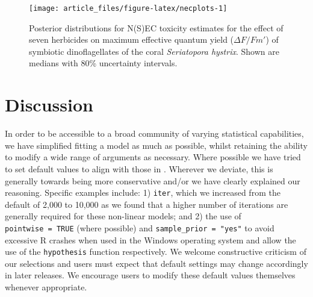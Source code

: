 \documentclass[
  shortnames]{jss}
\begin{document}
\begin{CodeChunk}
\begin{figure}[!ht]

{\centering \texttt{[image: article\_files/figure-latex/necplots-1]} 

}

\caption[Posterior distributions for N(S)EC toxicity estimates for the effect of seven herbicides on maximum effective quantum yield ($\Delta F / Fm'$) of symbiotic dinoflagellates of the coral \textit{Seriatopora hystrix}]{Posterior distributions for N(S)EC toxicity estimates for the effect of seven herbicides on maximum effective quantum yield ($\Delta F / Fm'$) of symbiotic dinoflagellates of the coral \textit{Seriatopora hystrix}. Shown are medians with 80\%  uncertainty intervals.}\label{fig:necplots}
\end{figure}
\end{CodeChunk}

\hypertarget{discussion}{%
\section{Discussion}\label{discussion}}

In order to be accessible to a broad community of varying statistical capabilities, we have simplified fitting a  model as much as possible, whilst retaining the ability to modify a wide range of arguments as necessary. Where possible we have tried to set default values to align with those in . Wherever we deviate, this is generally towards being more conservative and/or we have clearly explained our reasoning. Specific examples include: 1) \texttt{iter}, which we increased from the  default of 2,000 to 10,000 as we found that a higher number of iterations are generally required for these non-linear models; and 2) the use of \texttt{pointwise\ =\ TRUE} (where possible) and \texttt{sample\_prior\ =\ "yes"} to avoid excessive R crashes when used in the Windows operating system and allow the use of the \texttt{hypothesis} function respectively. We welcome constructive criticism of our selections and users must expect that default settings may change accordingly in later releases. We encourage users to modify these default values themselves whenever appropriate.
\end{document}
